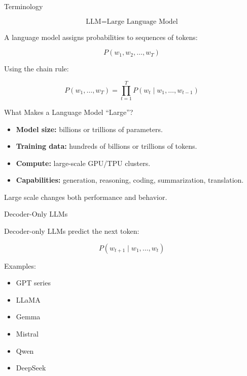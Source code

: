 \documentclass[aspectratio=169]{beamer}
\begin{document}
\begin{frame}{Terminology}

\[
\text{LLM} = \text{Large Language Model}
\]

\vspace{0.5cm}

A language model assigns probabilities to sequences of tokens:

\[
P(w_1, w_2, \ldots, w_T)
\]

\vspace{0.4cm}

Using the chain rule:

\[
P(w_1,\ldots,w_T)
=
\prod_{t=1}^{T}
P(w_t \mid w_1,\ldots,w_{t-1})
\]

\end{frame}

\begin{frame}{What Makes a Language Model ``Large''?}

\begin{itemize}
    \item \textbf{Model size:} billions or trillions of parameters.
    \item \textbf{Training data:} hundreds of billions or trillions of tokens.
    \item \textbf{Compute:} large-scale GPU/TPU clusters.
    \item \textbf{Capabilities:} generation, reasoning, coding, summarization, translation.
\end{itemize}

\vspace{0.4cm}

Large scale changes both performance and behavior.

\end{frame}

\begin{frame}{Decoder-Only LLMs}

Decoder-only LLMs predict the next token:

\[
P(w_{t+1} \mid w_1,\ldots,w_t)
\]

\vspace{0.4cm}

Examples:

\begin{itemize}
    \item GPT series
    \item LLaMA
    \item Gemma
    \item Mistral
    \item Qwen
    \item DeepSeek
\end{itemize}

\end{frame}
\end{document}
